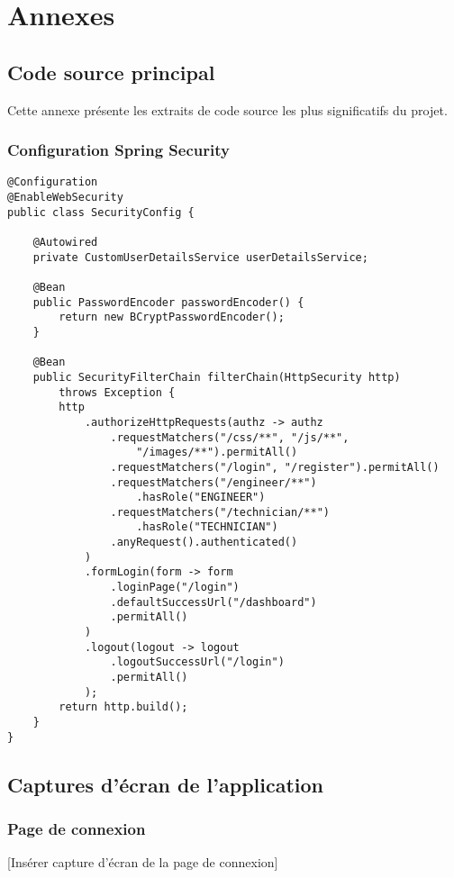 \chapter{Annexes}

\section{Code source principal}

Cette annexe présente les extraits de code source les plus significatifs du projet.

\subsection{Configuration Spring Security}

\begin{verbatim}
@Configuration
@EnableWebSecurity
public class SecurityConfig {
    
    @Autowired
    private CustomUserDetailsService userDetailsService;
    
    @Bean
    public PasswordEncoder passwordEncoder() {
        return new BCryptPasswordEncoder();
    }
    
    @Bean
    public SecurityFilterChain filterChain(HttpSecurity http) 
        throws Exception {
        http
            .authorizeHttpRequests(authz -> authz
                .requestMatchers("/css/**", "/js/**", 
                    "/images/**").permitAll()
                .requestMatchers("/login", "/register").permitAll()
                .requestMatchers("/engineer/**")
                    .hasRole("ENGINEER")
                .requestMatchers("/technician/**")
                    .hasRole("TECHNICIAN")
                .anyRequest().authenticated()
            )
            .formLogin(form -> form
                .loginPage("/login")
                .defaultSuccessUrl("/dashboard")
                .permitAll()
            )
            .logout(logout -> logout
                .logoutSuccessUrl("/login")
                .permitAll()
            );
        return http.build();
    }
}
\end{verbatim}

\section{Captures d'écran de l'application}

\subsection{Page de connexion}
[Insérer capture d'écran de la page de connexion]

